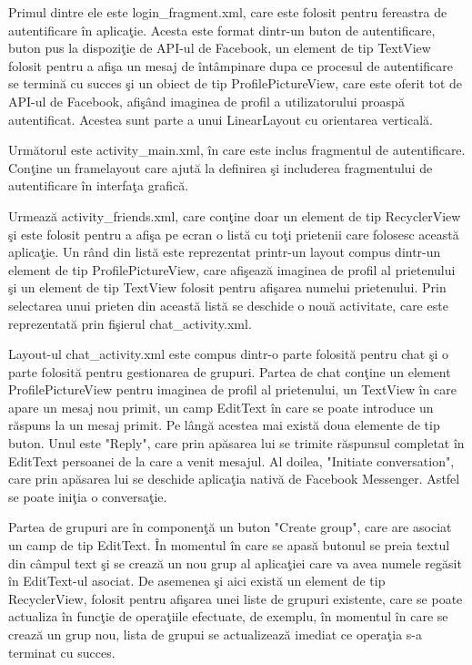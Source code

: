 	Primul dintre ele este login_fragment.xml, care este folosit pentru fereastra de autentificare \^{i}n aplica\c{t}ie. Acesta este format dintr-un buton de autentificare, buton pus la dispozi\c{t}ie de API-ul de Facebook, un element de tip TextView folosit pentru a afi\c{s}a un mesaj de \^{i}nt\^{a}mpinare dupa ce procesul de autentificare se termin\u{a} cu succes \c{s}i un obiect de tip ProfilePictureView, care este oferit tot de API-ul de Facebook, afi\c{s}\^{a}nd imaginea de profil a utilizatorului proasp\u{a} autentificat. Acestea sunt parte a unui LinearLayout cu orientarea vertical\u{a}.

	Urm\u{a}torul este activity_main.xml, \^{i}n care este inclus fragmentul de autentificare. Con\c{t}ine un framelayout care ajut\u{a} la definirea \c{s}i includerea fragmentului de autentificare \^{i}n interfa\c{t}a grafic\u{a}.
	
	Urmeaz\u{a} activity_friends.xml, care con\c{t}ine doar un element de tip RecyclerView \c{s}i este folosit pentru a afi\c{s}a pe ecran o list\u{a} cu to\c{t}i prietenii care folosesc aceast\u{a} aplica\c{t}ie. Un r\^{a}nd din list\u{a} este reprezentat printr-un layout compus dintr-un element de tip ProfilePictureView, care afi\c{s}eaz\u{a} imaginea de profil al prietenului \c{s}i un element de tip TextView folosit pentru afi\c{s}area numelui prietenului. Prin selectarea unui prieten din aceast\u{a} list\u{a} se deschide o nou\u{a} activitate, care este reprezentat\u{a} prin fi\c{s}ierul chat_activity.xml. 
	
	Layout-ul chat_activity.xml este compus dintr-o parte folosit\u{a} pentru chat \c{s}i o parte folosit\u{a} pentru gestionarea de grupuri. Partea de chat con\c{t}ine un element ProfilePictureView pentru imaginea de profil al prietenului, un TextView \^{i}n care apare un mesaj nou primit, un camp EditText \^{i}n care se poate introduce un r\u{a}spuns la un mesaj primit. Pe l\^{a}ng\u{a} acestea mai exist\u{a} doua elemente de tip buton. Unul este "Reply", care prin ap\u{a}sarea lui se trimite r\u{a}spunsul completat \^{i}n EditText persoanei de la care a venit mesajul. Al doilea, "Initiate conversation", care prin ap\u{a}sarea lui se deschide aplica\c{t}ia nativ\u{a} de Facebook Messenger. Astfel se poate ini\c{t}ia o conversa\c{t}ie.

	Partea de grupuri are \^{i}n componen\c{t}\u{a} un buton "Create group", care are asociat un camp de tip EditText. \^{I}n momentul \^{i}n care se apas\u{a} butonul se preia textul din c\^{a}mpul text \c{s}i se creaz\u{a} un nou grup al aplica\c{t}iei care va avea numele reg\u{a}sit \^{i}n EditText-ul asociat. De asemenea \c{s}i aici exist\u{a} un element de tip RecyclerView, folosit pentru afi\c{s}area unei liste de grupuri existente, care se poate actualiza \^{i}n func\c{t}ie de opera\c{t}iile efectuate, de exemplu, \^{i}n momentul \^{i}n care se creaz\u{a} un grup nou, lista de grupui se actualizeaz\u{a} imediat ce opera\c{t}ia s-a terminat cu succes. 
	
